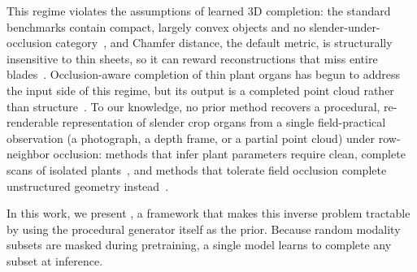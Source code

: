  This regime violates the
assumptions of learned 3D completion: the standard benchmarks contain
compact, largely convex objects and no slender-under-occlusion
category~\citep{yuan2018pcn,yu2021pointr}, and Chamfer distance, the
default metric, is structurally insensitive to thin sheets, so it can
reward reconstructions that miss entire blades~\citep{wu2021dcd,
song2026structural}. Occlusion-aware completion of thin plant organs has
begun to address the input side of this regime, but its output is a
completed point cloud rather than structure~\citep{lee2026occ}.
To our knowledge, no prior method recovers a procedural, re-renderable
representation of slender crop organs from a single field-practical
observation (a photograph, a depth frame, or a partial point cloud)
under row-neighbor occlusion: methods that infer plant
parameters require clean, complete scans of isolated
plants~\citep{demeter2025,ghrer2025paramplants}, and methods that
tolerate field occlusion complete unstructured geometry
instead~\citep{lee2026occ}.

In this work, we present \method{}, a framework that makes this inverse
problem tractable by using the procedural generator itself as the prior.
 Because random modality subsets are masked during pretraining,
a single model learns to complete any subset at inference.

